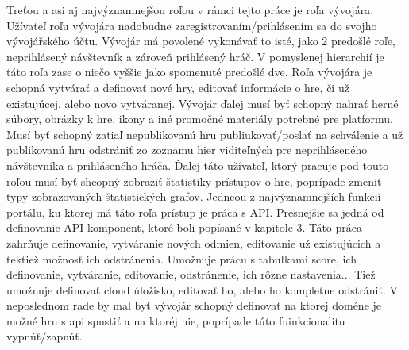 Treťou a asi aj najvýznamnejšou roľou v rámci tejto práce je roľa vývojára. Užívateľ roľu vývojára nadobudne zaregistrovaním/prihlásením sa do svojho vývojářského účtu. Vývojár má povolené vykonávať to isté, jako 2 predošlé roľe, neprihlásený návštevník a zároveň prihlásený hráč. V pomyslenej hierarchií je táto roľa zase o niečo vyššie jako spomenuté predošlé dve. Roľa vývojára je schopná vytvárať a definovať nové hry, editovať informácie o hre, či už existujúcej, alebo novo vytváranej. Vývojár ďalej musí byť schopný nahrať herné súbory, obrázky k hre, ikony a iné promočné materiály potrebné pre platformu. Musí byť schopný zatiaľ nepublikovanú hru publiukovať/poslať na schválenie a už publikovanú hru odstrániť zo zoznamu hier viditeľných pre neprihláseného návštevníka a prihláseného hráča. Ďalej táto užívateľ, ktorý pracuje pod touto roľou musí byť shcopný zobraziť štatistiky prístupov o hre, poprípade zmeniť typy zobrazovaných štatistických grafov. Jedneou z najvýznamnejších funkcií portálu, ku ktorej má táto roľa prístup je práca s API. Presnejšie sa jedná od definovanie API komponent, ktoré boli popísané v kapitole 3. Táto práca zahrňuje definovanie, vytváranie nových odmien, editovanie už existujúcich a tektiež možnosť ich odstránenia. Umožnuje prácu s tabuľkami score, ich definovanie, vytváranie, editovanie, odstránenie, ich rôzne nastavenia... Tiež umožnuje definovať cloud úložisko, editovať ho, alebo ho kompletne odstrániť. V neposlednom rade by mal byť vývojár schopný definovať na ktorej doméne je možné hru s api spustiť a na ktoréj nie, poprípade túto fuinkcionalitu vypnúť/zapnúť. 

